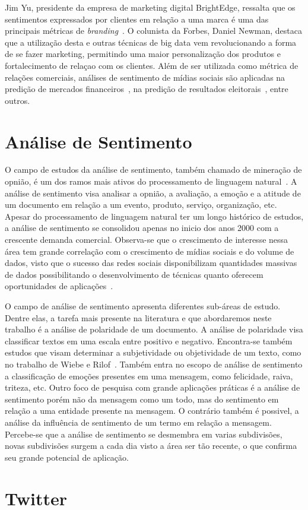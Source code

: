 Jim Yu, presidente da empresa de marketing digital BrightEdge, ressalta que os sentimentos expressados por clientes em
relação a uma marca é uma das principais métricas de \textit{branding}~\cite{marketingland}.
O colunista da Forbes, Daniel Newman, destaca que a utilização desta e outras técnicas de big data vem revolucionando
a forma de se fazer marketing, permitindo uma maior personalização dos produtos e fortalecimento de relaçao com os
clientes.
Além de ser utilizada como métrica de relações comerciais, análises de sentimento de mídias sociais são aplicadas na
predição de mercados financeiros~\cite{bollen11}, na predição de resultados eleitorais~\cite{tumasjan10}, entre outros.

\section{Análise de Sentimento}

O campo de estudos da análise de sentimento, também chamado de mineração de opnião, é um dos ramos mais ativos do
processamento de linguagem natural~\cite{liu12}.
A análise de sentimento visa analisar a opnião, a avaliação, a emoção e  a atitude de um documento em relação a um
evento, produto, serviço, organização, etc.
Apesar do processamento de linguagem natural ter um longo histórico de estudos, a análise de sentimento se consolidou
apenas no inicio dos anos 2000 com a crescente demanda comercial.
Observa-se que o crescimento de interesse nessa área tem grande correlação com o crescimento de mídias sociais e do
volume de dados, visto que o sucesso das redes sociais disponibilizam quantidades massivas de dados possibilitando o
desenvolvimento de técnicas quanto oferecem oportunidades de aplicações~\cite{liu12}.

O campo de análise de sentimento apresenta diferentes sub-áreas de estudo.
Dentre elas, a tarefa mais presente na literatura e que abordaremos neste trabalho é a análise de polaridade de um
documento.
A análise de polaridade visa classificar textos em uma escala entre positivo e negativo.
Encontra-se também estudos que visam determinar a subjetividade ou objetividade de um texto, como no trabalho de Wiebe e
Rilof~\cite{Wiebe05}.
Também entra no escopo de análise de sentimento a classificação de emoções presentes em uma mensagem, como felicidade,
raiva, triteza, etc.
Outro foco de pesquisa com grande aplicações práticas é a análise de sentimento porém não da mensagem como um todo, mas
do sentimento em relação a uma entidade presente na mensagem.
O contrário também é possivel, a análise da influência de sentimento de um termo em relação a mensagem.
Percebe-se que a análise de sentimento se desmembra em varias subdivisões, novas subdivisões surgem a cada dia visto a
área ser tão recente, o que confirma seu grande potencial de aplicação.


\section{Twitter}
